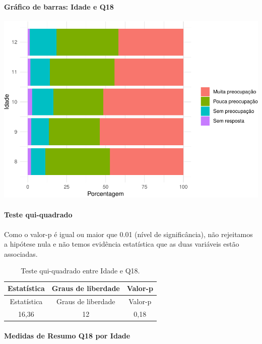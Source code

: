 \documentclass[]{article}
\let\oldparagraph\paragraph
\renewcommand{\paragraph}[1]{\oldparagraph{#1}\mbox{}}
\begin{document}
\hypertarget{gruxe1fico-de-barras-idade-e-q18}{%
\paragraph{Gráfico de barras: Idade e Q18}\label{gruxe1fico-de-barras-idade-e-q18}}

\begin{center}\includegraphics[width=0.75\linewidth]{relatorio_covid19_files/figure-latex/unnamed-chunk-269-1} \end{center}

\hypertarget{teste-qui-quadrado-24}{%
\paragraph{Teste qui-quadrado}\label{teste-qui-quadrado-24}}

Como o valor-p é igual ou maior que 0.01 (nível de significância), não rejeitamos a hipótese nula e não temos evidência estatística que as duas variáveis estão associadas.

\begin{longtable}[]{@{}ccc@{}}
\caption{\label{tab:unnamed-chunk-271}Teste qui-quadrado entre Idade e Q18.}\tabularnewline
\toprule
Estatística & Graus de liberdade & Valor-p\tabularnewline
\midrule
\endfirsthead
\toprule
Estatística & Graus de liberdade & Valor-p\tabularnewline
\midrule
\endhead
16,36 & 12 & 0,18\tabularnewline
\bottomrule
\end{longtable}

\cleardoublepage

\hypertarget{medidas-de-resumo-q18-por-idade}{%
\paragraph{Medidas de Resumo Q18 por Idade}\label{medidas-de-resumo-q18-por-idade}}
\end{document}
